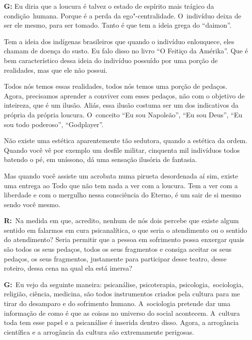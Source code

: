  

\textbf{G:} Eu diria que a loucura é talvez o estado de espírito mais
trágico da condição\textbf{}~humana. Porque é a perda da
ego"-centralidade. O~indivíduo deixa de ser ele mesmo, para ser tomado.
Tanto é que tem a ideia grega do ``daimon''.

 

Tem a ideia dos indígenas brasileiros que quando o indivíduo enlouquece,
eles chamam de doença do susto. Eu falo disso no livro ``O Feitiço da
Amérika''. Que é bem característico dessa ideia do indivíduo possuído
por uma porção de realidades, mas que ele não possui.

 

Todos nós temos essas realidades, todos nós temos uma porção de pedaços.
Agora, precisamos aprender a conviver com esses pedaços, não com o
objetivo de inteireza, que é um ilusão. Aliás, essa ilusão costuma ser
um dos indicativos da própria da própria loucura. O~conceito ``Eu sou
Napoleão'', ``Eu sou Deus'', ``Eu sou todo poderoso'', ``Godplayer''.

 

Não existe uma estética aparentemente tão sedutora, quando a estética da
ordem. Quando você vê por exemplo um desfile militar, cinquenta mil
indivíduos todos batendo o pé, em uníssono, dá uma sensação ilusória de
fantasia.

 

Mas quando você assiste um acrobata numa pirueta desordenada aí sim,
existe uma entrega ao Todo que não tem nada a ver com a loucura. Tem a
ver com a liberdade e com o mergulho nessa consciência do Eterno, é um
sair de si mesmo sendo você mesmo.

 

\textbf{R:}~Na medida em que, acredito, nenhum de nós dois percebe que
existe algum sentido em falarmos em cura psicanalítica, o que seria o
atendimento ou o sentido do atendimento? Seria permitir que a pessoa em
sofrimento possa enxergar quais são todos os seus pedaços, todos os seus
fragmentos e consiga aceitar os seus pedaços, os seus fragmentos,
justamente para participar desse teatro, desse roteiro, dessa cena na
qual ela está imersa?

 

\textbf{G:}~Eu vejo da seguinte maneira: psicanálise, psicoterapia,
psicologia,\textbf{}~sociologia, religião, ciência, medicina, são todos
instrumentos criados pela cultura para me tirar do desamparo e do
sofrimento humano. A~sociologia pretende dar uma informação de como é
que as coisas no universo do social acontecem. A~cultura toda tem esse
papel e a psicanálise é inserida dentro disso. Agora, a arrogância
científica e a arrogância da cultura são extremamente perigosas.

